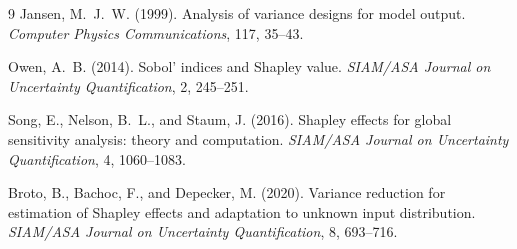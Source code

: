 \documentclass[11pt]{article}
\begin{document}
\begin{thebibliography}{9}
 Jansen, M.~J.~W. (1999). Analysis of variance designs for
model output. \emph{Computer Physics Communications}, 117, 35--43.

 Owen, A.~B. (2014). Sobol' indices and Shapley value.
\emph{SIAM/ASA Journal on Uncertainty Quantification}, 2, 245--251.

 Song, E., Nelson, B.~L., and Staum, J. (2016). Shapley effects
for global sensitivity analysis: theory and computation. \emph{SIAM/ASA Journal on
Uncertainty Quantification}, 4, 1060--1083.

 Broto, B., Bachoc, F., and Depecker, M. (2020). Variance
reduction for estimation of Shapley effects and adaptation to unknown input
distribution. \emph{SIAM/ASA Journal on Uncertainty Quantification}, 8, 693--716.
\end{thebibliography}
\end{document}
